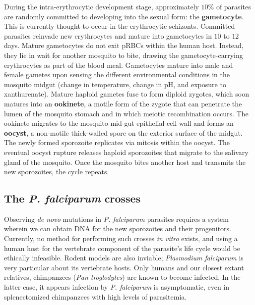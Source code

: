 During the intra-erythrocytic development stage, approximately $10\%$ of parasites are randomly committed to developing into the sexual form: the \textbf{gametocyte}\cite{Sinden:1983tx}.  This is currently thought to occur in the erythrocytic schizonts.  Committed parasites reinvade new erythrocytes and mature into gametocytes in $10$ to $12$ days.  Mature gametocytes do not exit pRBCs within the human host.  Instead, they lie in wait for another mosquito to bite, drawing the gametocyte-carrying erythrocytes as part of the blood meal.  Gametocytes mature into male and female gametes upon sensing the different environmental conditions in the mosquito midgut (change in temperature, change in pH, and exposure to xanthurenate).  Mature haploid gametes fuse to form diploid zygotes, which soon matures into an \textbf{ookinete}, a motile form of the zygote that can penetrate the lumen of the mosquito stomach and in which meiotic recombination occurs.  The ookinete migrates to the mosquito mid-gut epithelial cell wall and forms an \textbf{oocyst}, a non-motile thick-walled spore on the exterior surface of the midgut.  The newly formed sporozoite replicates via mitosis within the oocyst.  The eventual oocyst rupture releases haploid sporozoites that migrate to the salivary gland of the mosquito.  Once the mosquito bites another host and transmits the new sporozoites, the cycle repeats.

\subsection{The \textit{P. falciparum} crosses}

Observing \textit{de novo} mutations in \textit{P. falciparum} parasites requires a system wherein we can obtain DNA for the new sporozoites and their progenitors.  Currently, no method for performing such crosses \textit{in vitro} exists, and using a human host for the vertebrate component of the parasite's life cycle would be ethically infeasible.  Rodent models are also inviable; \textit{Plasmodium falciparum} is very particular about its vertebrate hosts.  Only humans and our closest extant relatives, chimpanzees (\textit{Pan troglodytes}) are known to become infected.  In the latter case, it appears infection by \textit{P. falciparum} is asymptomatic, even in splenectomized chimpanzees with high levels of parasitemia\cite{MacFie:2009kn}.

